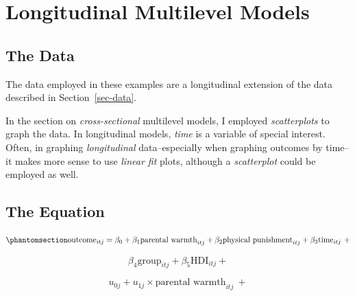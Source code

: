 \documentclass[
  letterpaper,
  DIV=11,
  numbers=noendperiod]{scrreprt}
\begin{document}

\chapter{Longitudinal Multilevel
Models}\label{longitudinal-multilevel-models}

\section{The Data}\label{the-data}

The data employed in these examples are a longitudinal extension of the
data described in Section~\ref{sec-data}.

\begin{tcolorbox}[enhanced jigsaw, coltitle=black, bottomtitle=1mm, leftrule=.75mm, colframe=quarto-callout-tip-color-frame, left=2mm, opacitybacktitle=0.6, colback=white, rightrule=.15mm, title=\textcolor{quarto-callout-tip-color}{\faLightbulb}\hspace{0.5em}{Graphing Longitudinal Data}, breakable, opacityback=0, toprule=.15mm, toptitle=1mm, titlerule=0mm, arc=.35mm, bottomrule=.15mm, colbacktitle=quarto-callout-tip-color!10!white]

In the section on \emph{cross-sectional} multilevel models, I employed
\emph{scatterplots} to graph the data. In longitudinal models,
\emph{time} is a variable of special interest. Often, in graphing
\emph{longitudinal} data--especially when graphing outcomes by time--it
makes more sense to use \emph{linear fit} plots, although a
\emph{scatterplot} could be employed as well.

\end{tcolorbox}

\section{The Equation}\label{the-equation-2}

\begin{equation}\phantomsection\label{eq-MLM-longitudinal}{\text{outcome}_{itj} = \beta_0 + \beta_1 \text{parental warmth}_{itj} + \beta_2 \text{physical punishment}_{itj} + \beta_3 \text{time}_{itj} \ + }\end{equation}

\[\beta_4 \text{group}_{itj} + \beta_5 \text{HDI}_{itj} +\]

\[u_{0j} + u_{1j} \times \text{parental warmth}_{itj} \ + \]
\end{document}

